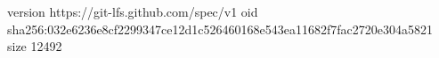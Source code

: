 version https://git-lfs.github.com/spec/v1
oid sha256:032e6236e8cf2299347ce12d1c526460168e543ea11682f7fac2720e304a5821
size 12492
